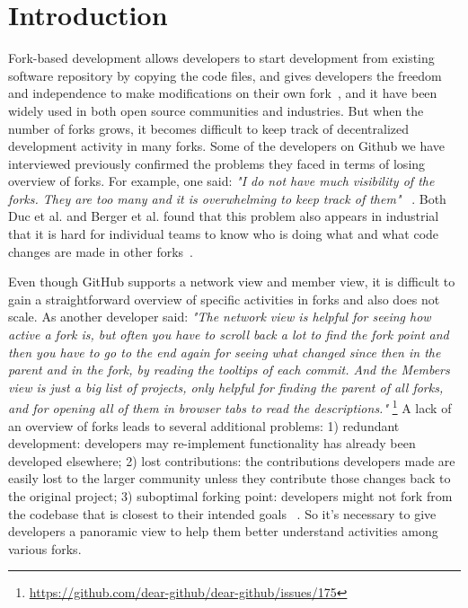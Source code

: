 \section{Introduction}
Fork-based development allows developers to start development from existing software repository by copying the code files, and gives developers the freedom and independence to make modifications on their own fork~\cite{dubinsky2013exploratory, bitzer2006impact, ernst2010code,vetter2007open}, and it have been widely used in both open source communities and industries. But when the number of forks grows, it becomes difficult to keep track of decentralized development activity in many forks. Some of the developers on Github we have interviewed previously confirmed the problems they faced in terms of losing overview of forks. For example, one said: \emph{"I do not have much visibility of the forks. They are too many and it is overwhelming to keep track of them"} ~\cite{ZSLXWK:ICSE18}. Both Duc et al. and Berger et al. found that this problem also appears in industrial that it is hard for individual teams to know who is doing what and what code changes are made in other forks~\cite{berger2014three,Duc:2014:FCM:2652524.2652546}.

Even though GitHub supports a network view and member view, it is difficult to gain a straightforward overview of specific activities in forks and also does not scale. As another developer said: \emph{"The network view is helpful for seeing how active a fork is, but often you have to scroll back a lot to find the fork point and then you have to go to the end again for seeing what changed since then in the parent and in the fork, by reading the tooltips of each commit. And the Members view is just a big list of projects, only helpful for finding the parent of all forks, and for opening all of them in browser tabs to read the descriptions."} \footnote{\url{https://github.com/dear-github/dear-github/issues/175}}
 A lack of an overview of forks leads to several additional problems: 1) redundant development: developers may re-implement functionality has already been developed elsewhere; 2) lost contributions: the contributions developers made are easily lost to the larger community unless they contribute those changes back to the original project; 3) suboptimal forking point: developers might not fork from the codebase that is closest to their intended goals ~\cite{ZSLXWK:ICSE18, dubinsky2013exploratory,stanciulescu2015forked}. So it's necessary to give developers a panoramic view to help them better understand activities among various forks.


